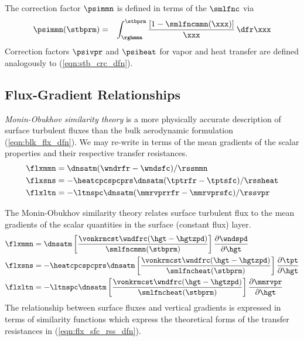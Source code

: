 \documentclass[12pt,twoside]{book}
\begin{document}
The correction factor $\psimmn$ is defined in terms of the 
 $\smlfnc$ via
\begin{eqnarray}
\psimmn(\stbprm) & = & \int_{\rghmmn}^{\stbprm} 
\frac{[1-\smlfncmmn(\xxx)]}{\xxx} \,\dfr\xxx
\label{eqn:stb_crc_dfn}
\end{eqnarray}
Correction factors $\psivpr$ and $\psiheat$ for vapor and heat
transfer are defined analogously to (\ref{eqn:stb_crc_dfn}).

\subsection[Flux-Gradient Relationships]{Flux-Gradient Relationships}
\textit{Monin-Obukhov similarity theory} is a more physically accurate
description of surface turbulent fluxes than the bulk aerodynamic
formulation (\ref{eqn:blk_flx_dfn}).
We may re-write in terms of the mean gradients of the scalar
properties and their respective transfer resistances.
\begin{subequations}
\label{eqn:flx_sfc_rss_dfn}
\begin{align}
\label{eqn:flx_sfc_rss_mmn_dfn}
\flxmmn & = \dnsatm (\wndrfr-\wndsfc)/\rssmmn \\ %
\label{eqn:flx_sfc_rss_heat_dfn}
\flxsns & = -\heatcpcspcprs \dnsatm (\tptrfr-\tptsfc)/\rssheat \\ %
\label{eqn:flx_sfc_rss_vpr_dfn}
\flxltn & = -\ltnspc \dnsatm (\mmrvprrfr-\mmrvprsfc)/\rssvpr %
\end{align}
\end{subequations}

The Monin-Obukhov similarity theory relates surface turbulent flux to
the mean gradients of the scalar quantities in the surface (constant
flux) layer.
\begin{subequations}
\label{eqn:flx_trb_sfc_flx_grd_dfn}
\begin{align}
\label{eqn:flx_trb_sfc_flx_grd_mmn_dfn}
\flxmmn & = \dnsatm \left[ \frac{\vonkrmcst\wndfrc(\hgt-\hgtzpd)}{\smlfncmmn(\stbprm)} \right] \frac{\partial\wndspd}{\partial\hgt} \\ %
\label{eqn:flx_trb_sfc_flx_grd_heat_dfn}
\flxsns & = -\heatcpcspcprs \dnsatm \left[ \frac{\vonkrmcst\wndfrc(\hgt-\hgtzpd)}{\smlfncheat(\stbprm)} \right] \frac{\partial\tpt}{\partial\hgt} \\ %
\label{eqn:flx_trb_sfc_flx_grd_vpr_dfn}
\flxltn & = -\ltnspc \dnsatm \left[ \frac{\vonkrmcst\wndfrc(\hgt-\hgtzpd)}{\smlfncheat(\stbprm)} \right] \frac{\partial\mmrvpr}{\partial\hgt} %
\end{align}
\end{subequations}
The relationship between surface fluxes and vertical gradients is
expressed in terms of similarity functions which express the
theoretical forms of the transfer resistances in
(\ref{eqn:flx_sfc_rss_dfn}). 
\end{document}
